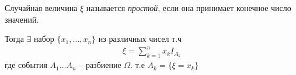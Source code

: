 \begin{definition}
  Случайная величина $\xi$ называется \emph{простой}, если она принимает конечное число значений. 

  Тогда $\exists$ набор $\{x_1, \ldots, x_n\}$ из различных чисел т.ч
  \begin{align*}
    \xi = \sum_{k = 1}^{n} x_k I_{A_k}
  \end{align*}
  где события $A_1 \ldots A_n$ -- разбиение $\Omega$. т.е $A_k = \{ \xi = x_k \}$
\end{definition}

